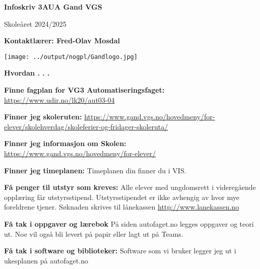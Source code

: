\documentclass[12pt,a4paper]{article}
\begin{document}
\begin{titlepage}
   \begin{center}
       \vspace*{1cm}

       \textbf{Infoskriv 3AUA Gand VGS}

       \vspace{0.5cm}
        Skoleåret 2024/2025
            
       \vspace{1.5cm}

       \textbf{Kontaktlærer: Fred-Olav Mosdal}

       \vfill
            
            
     
       \texttt{[image: ../output/nogpl/Gandlogo.jpg]}
    \vfill        
            
   \end{center}
\end{titlepage}


\centerline{\bf Hvordan . . .} \bigskip 

\noindent
{\bf Finne fagplan for VG3 Automatiseringsfaget:} \url{https://www.udir.no/lk20/aut03-04}
\vskip 10pt

\noindent
{\bf Finner jeg skoleruten:} \url{https://www.gand.vgs.no/hovedmeny/for-elever/skolehverdag/skoleferier-og-fridager-skoleruta/}
\vskip 10pt

\noindent
{\bf Finner jeg informasjon om Skolen:} \url{https://www.gand.vgs.no/hovedmeny/for-elever/}
\vskip 10pt

\noindent
{\bf Finner jeg timeplanen:} Timeplanen din finner du i VIS. 
\vskip 10pt

\noindent
{\bf Få penger til utstyr som kreves:} Alle elever med ungdomsrett i videregående opplæring får utstyrsstipend. Utstyrsstipendet er ikke avhengig av hvor mye foreldrene tjener.
Søknaden skrives til lånekassen \url{http://www.lanekassen.no}
\vskip 10pt

\noindent
{\bf Få tak i oppgaver og lærebok} På siden autofaget.no legges oppgaver og teori ut. Noe vil også bli levert på papir eller lagt ut på Teams. 
\vskip 10pt

\noindent
{\bf Få tak i  software og biblioteker:} Software som vi bruker legger jeg ut i ukesplanen på autofaget.no  
\vskip 10pt
\end{document}
